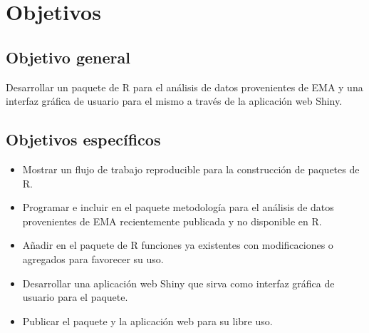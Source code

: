 \chapter{Objetivos}
\section{Objetivo general}
 
Desarrollar un paquete de R para el análisis de datos provenientes de EMA y una interfaz gráfica de usuario para el mismo a través de la aplicación web Shiny.


\section{Objetivos específicos}
\begin{itemize}
\item Mostrar un flujo de trabajo reproducible para la construcción de paquetes de R.
\item Programar e incluir en el paquete metodología para el análisis de datos provenientes de EMA recientemente publicada y no disponible en R.
\item Añadir en el paquete de R funciones ya existentes con modificaciones o agregados para favorecer su uso.
\item Desarrollar una aplicación web Shiny que sirva como interfaz gráfica de usuario para el paquete.
\item Publicar el paquete y la aplicación web para su libre uso.
\end{itemize}

